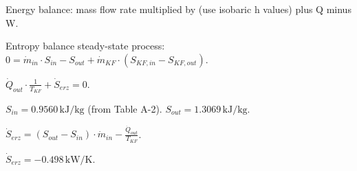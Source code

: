 Energy balance:  
mass flow rate multiplied by (use isobaric h values) plus Q minus W.

Entropy balance steady-state process:  
\( 0 = \dot{m}_{in} \cdot S_{in} - S_{out} + \dot{m}_{KF} \cdot \left( S_{KF,in} - S_{KF,out} \right) \).  

\( \dot{Q}_{out} \cdot \frac{1}{T_{KF}} + \dot{S}_{erz} = 0 \).  

\( S_{in} = 0.9560 \, \text{kJ/kg} \) (from Table A-2).  
\( S_{out} = 1.3069 \, \text{kJ/kg} \).  

\( \dot{S}_{erz} = \left( S_{out} - S_{in} \right) \cdot \dot{m}_{in} - \frac{\dot{Q}_{out}}{T_{KF}} \).  

\( \dot{S}_{erz} = -0.498 \, \text{kW/K} \).